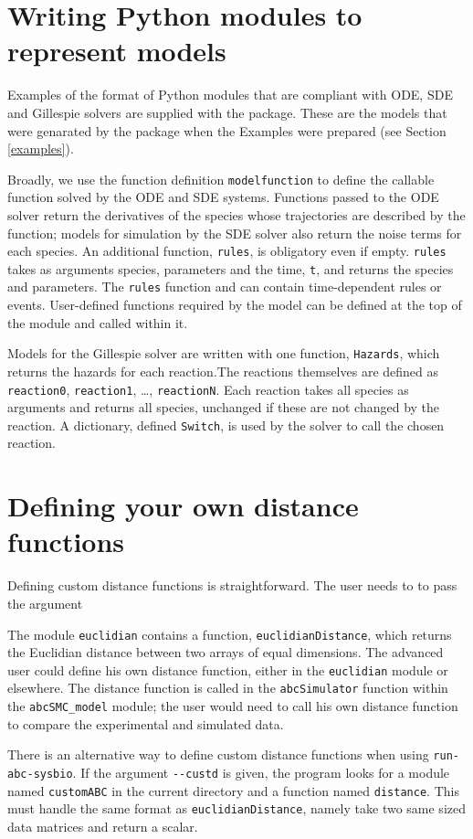 \documentclass[a4paper]{report}
\begin{document}
\section{Writing Python modules to represent models}
\label{extending}
Examples of the format of Python modules that are compliant with ODE, SDE and Gillespie solvers are supplied with the package. These are the models that were genarated by the package when the Examples were prepared (see Section \ref{examples}).

Broadly, we use the function definition \verb$modelfunction$ to define the callable function solved by the ODE and SDE systems. Functions passed to the ODE solver return the derivatives of the species whose trajectories are described by the function; models for simulation by the SDE solver also return the noise terms for each species. An additional function, \verb$rules$, is obligatory even if empty. \verb$rules$ takes as arguments species, parameters and the time, \verb$t$, and returns the species and parameters. The \verb$rules$ function and can contain time-dependent rules or events. User-defined functions required by the model can be defined at the top of the module and called within it.

Models for the Gillespie solver are written with one function, \verb$Hazards$, which returns the hazards for each reaction.The reactions themselves are defined as \verb$reaction0$, \verb$reaction1$, \dots, \verb$reactionN$. Each reaction takes all species as arguments and returns all species, unchanged if these are not changed by the reaction.  A dictionary, defined \verb$Switch$, is used by the solver to call the chosen reaction. 
\section{Defining your own distance functions}
Defining custom distance functions is straightforward. The user needs to to pass the argument 

The module \verb$euclidian$ contains a function, \verb$euclidianDistance$, which returns the Euclidian distance between two arrays of equal dimensions. The advanced user could define his own distance function, either in the \verb$euclidian$ module or elsewhere. The distance function is called in the \verb$abcSimulator$ function within the \verb$abcSMC_model$ module; the user would need to call his own distance function to compare the experimental and simulated data.

There is an alternative way to define custom distance functions when using \verb$run-abc-sysbio$. If the argument \verb$--custd$ is given, the program looks for a module named \verb$customABC$ in the current directory and a function named \verb$distance$. This must handle the same format as \verb$euclidianDistance$, namely take two same sized data matrices and return a scalar.
\end{document}
